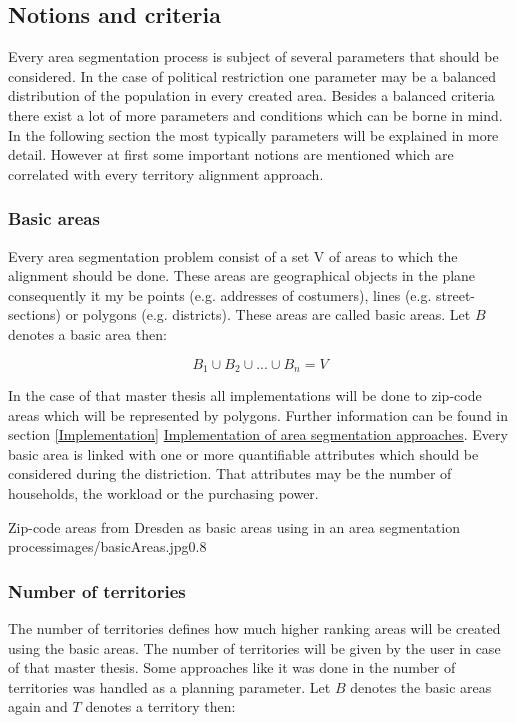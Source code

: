 \subsection{Notions and criteria}\label{notions}
Every area segmentation process is subject of several parameters that should be considered. In the case of political restriction one parameter may be a balanced distribution of the population in every created area. Besides a balanced criteria there exist a lot of more parameters and conditions which can be borne in mind. In the following section the most typically parameters will be explained in more detail. However at first some important notions are mentioned which are correlated with every territory alignment approach.

\subsubsection{Basic areas}
Every area segmentation problem consist of a set V of areas to which the alignment should be done. These areas are geographical objects in the plane consequently it my be points (e.g. addresses of costumers), lines (e.g. street-sections) or polygons (e.g. districts). These areas are called basic areas. Let $ B $ denotes a basic area then:

\[ \mathit{B_{1} \cup B_{2} \cup ... \cup B_{n}=V} \]

In the case of that master thesis all implementations will be done to zip-code areas which will be represented by polygons. Further information can be found in section \ref{Implementation} \hyperref[Implementation]{Implementation of area segmentation approaches}. Every basic area is linked with one or more quantifiable attributes which should be considered during the distriction. That attributes may be the number of households, the workload or the purchasing power.

\begin{figurevarSize}{Zip-code areas from Dresden as basic areas using in an area segmentation process}{images/basicAreas.jpg}{0.8}\end{figurevarSize}

\subsubsection{Number of territories}
The number of territories defines how much higher ranking areas will be created using the basic areas. The number of territories will be given by the user in case of that master thesis. Some approaches like it was done in \citeauthor{kalcsics} \cite{kalcsics} the number of territories was handled as a planning parameter. Let $ B $ denotes the basic areas again and $ T $ denotes a territory then:

